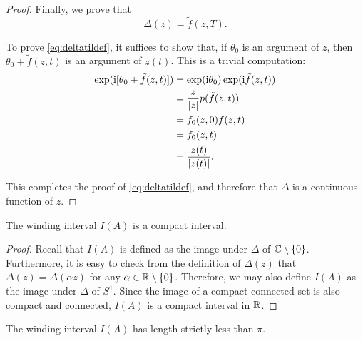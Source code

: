 \begin{proof}
Finally, we prove that
\begin{equation}\label{eq:deltatildef}
\Delta(z) = \tilde f(z,T).
\end{equation}

To prove \eqref{eq:deltatildef}, it suffices to show that, if $\theta_0$ is an argument of $z$, then $\theta_0 + \tilde f(z,t)$ is an argument of $z(t)$. This is a trivial computation:
\begin{equation}
\begin{aligned}
\exp(\mathrm{i}[\theta_0 + \tilde f(z,t)]) &= \exp(\mathrm{i} \theta_0) \exp(\mathrm{i} \tilde f(z,t))\\
&= \frac z {\lvert z\rvert} p(\tilde f(z,t))\\
&= f_0(z,0) f(z,t)\\
&= f_0(z,t)\\
&= \frac{z(t)}{\lvert z(t)\rvert}.
\end{aligned}
\end{equation}

This completes the proof of \eqref{eq:deltatildef}, and therefore that $\Delta$ is a continuous function of $z$.
\end{proof}

\begin{corollary}
The winding interval $I(A)$ is a compact interval.
\end{corollary}

\begin{proof}
Recall that $I(A)$ is defined as the image under $\Delta$ of $\mathbb{C} \setminus \{0\}$. Furthermore, it is easy to check from the definition of $\Delta(z)$ that $\Delta(z) = \Delta(\alpha z)$ for any $\alpha \in \mathbb{R} \setminus \{0\}$. Therefore, we may also define $I(A)$ as the image under $\Delta$ of $S^1$. Since the image of a compact connected set is also compact and connected, $I(A)$ is a compact interval in $\mathbb{R}$.
\end{proof}

\begin{prop}
The winding interval $I(A)$ has length strictly less than $\pi$.
\end{prop}

